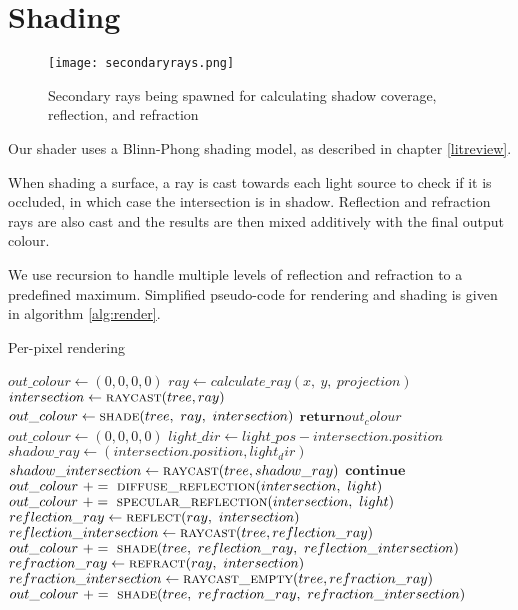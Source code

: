 \section{Shading}
\begin{figure}
\centering
	\texttt{[image: secondaryrays.png]}
	\caption{Secondary rays being spawned for calculating shadow coverage, reflection, and refraction}
	\label{fig:secondaryrays}
\end{figure}

Our shader uses a Blinn-Phong shading model, as described in chapter \ref{litreview}.

When shading a surface, a ray is cast towards each light source to check if it is occluded, in which case the intersection is in shadow. Reflection and refraction rays are also cast and the results are then mixed additively with the final output colour.

We use recursion to handle multiple levels of reflection and refraction to a predefined maximum. Simplified pseudo-code for rendering and shading is given in algorithm \ref{alg:render}.

\begin{algorithm}
\caption{Per-pixel rendering}
\label{alg:render}
\begin{algorithmic}[1]
	\State $out\_colour \gets (0, 0, 0, 0)$
	\State $ray \gets calculate\_ray(x,~y,~projection)$
	\State $intersection \gets \Call{raycast}{tree, ray}$
		\State $out\_colour \gets \Call{shade}{tree,~ ray,~ intersection}$
	\EndIf
	\State $\textbf{return} out_colour$
\EndProcedure
\\
	\State $out\_colour \gets (0, 0, 0, 0)$
	 
		\State $light\_dir \gets light\_pos - intersection.position$ 
		\State $shadow\_ray \gets (intersection.position, light_dir)$
		\State $shadow\_intersection \gets \Call{raycast}{tree, shadow\_ray}$
			\State $\textbf{continue}$
		\EndIf
		\State $out\_colour ~+=~ \Call{diffuse\_reflection}{intersection,~light}$
		\State $out\_colour ~+=~ \Call{specular\_reflection}{intersection,~light}$
	\EndFor
	\\
	\State $reflection\_ray \gets \Call{reflect}{ray,~intersection}$ 
	\State $reflection\_intersection \gets \Call{raycast}{tree, reflection\_ray}$
		\State $out\_colour ~+=~ \Call{shade}{tree,~ reflection\_ray,~ reflection\_intersection}$
	\EndIf
	\\
	\State $refraction\_ray \gets \Call{refract}{ray,~intersection}$ 
	\State $refraction\_intersection \gets \Call{raycast\_empty}{tree, refraction\_ray}$
		\State $out\_colour ~+=~ \Call{shade}{tree,~ refraction\_ray,~ refraction\_intersection}$
	\EndIf
\EndProcedure
\end{algorithmic}
\end{algorithm}

